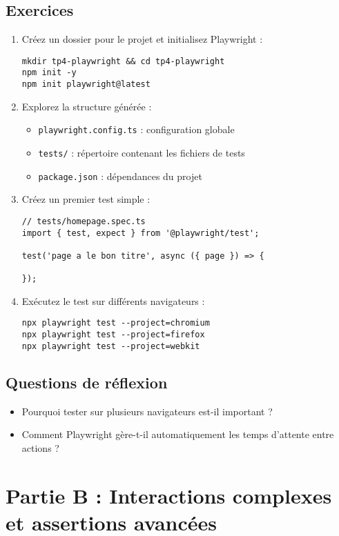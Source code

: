 \documentclass[a4paper,12pt]{article}
\begin{document}
\subsection*{Exercices}
\begin{enumerate}
\item Créez un dossier pour le projet et initialisez Playwright :
\begin{lstlisting}
mkdir tp4-playwright && cd tp4-playwright
npm init -y
npm init playwright@latest
\end{lstlisting}

\item Explorez la structure générée :
\begin{itemize}
\item \texttt{playwright.config.ts} : configuration globale
\item \texttt{tests/} : répertoire contenant les fichiers de tests
\item \texttt{package.json} : dépendances du projet
\end{itemize}

\item Créez un premier test simple :
\begin{lstlisting}
// tests/homepage.spec.ts
import { test, expect } from '@playwright/test';

test('page a le bon titre', async ({ page }) => {

});
\end{lstlisting}

\item Exécutez le test sur différents navigateurs :
\begin{lstlisting}
npx playwright test --project=chromium
npx playwright test --project=firefox
npx playwright test --project=webkit
\end{lstlisting}
\end{enumerate}

\subsection*{Questions de réflexion}
\begin{itemize}
\item Pourquoi tester sur plusieurs navigateurs est-il important ?
\item Comment Playwright gère-t-il automatiquement les temps d’attente entre actions ?
\end{itemize}

\newpage
\section*{Partie B : Interactions complexes et assertions avancées}
\end{document}
